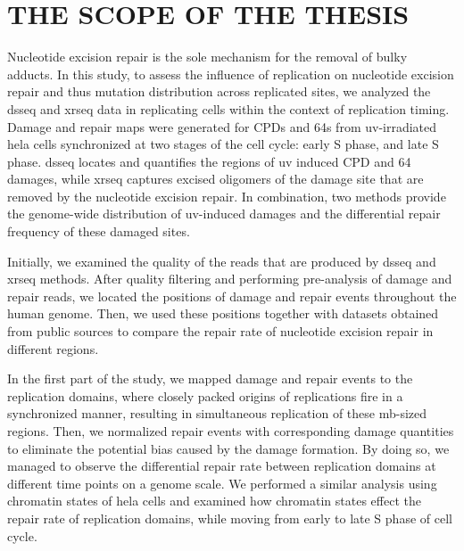 \setlength{\parindent}{0pt}
\chapter{\bf THE SCOPE OF THE THESIS}

Nucleotide excision repair is the sole mechanism for the removal of bulky adducts. In this study, to assess the influence of replication on nucleotide excision repair and thus mutation distribution across replicated sites, we analyzed the \gls{dsseq} and \gls{xrseq} data in replicating cells within the context of replication timing. Damage and repair maps were generated for \gls{CPD}s and \gls{64}s from \gls{uv}-irradiated \gls{hela} cells synchronized at two stages of the cell cycle: early S phase, and late S phase. \gls{dsseq} locates and quantifies the regions of \gls{uv} induced \gls{CPD} and \gls{64} damages, while \gls{xrseq} captures excised oligomers of the damage site that are removed by the nucleotide excision repair. In combination, two methods provide the genome-wide distribution of \gls{uv}-induced damages and the differential repair frequency of these damaged sites. 

Initially, we examined the quality of the reads that are produced by \gls{dsseq} and \gls{xrseq} methods. After quality filtering and performing pre-analysis of damage and repair reads, we located the positions of damage and repair events throughout the human genome. Then, we used these positions together with datasets obtained from public sources to compare the repair rate of nucleotide excision repair in different regions.

In the first part of the study, we mapped damage and repair events to the replication domains, where closely packed origins of replications fire in a synchronized manner, resulting in simultaneous replication of these \gls{mb}-sized regions. Then, we normalized repair events with corresponding damage quantities to eliminate the potential bias caused by the damage formation. By doing so, we managed to observe the differential repair rate between replication domains at different time points on a genome scale. We performed a similar analysis using chromatin states of \gls{hela} cells and examined how chromatin states effect the repair rate of replication domains, while moving from early to late S phase of cell cycle.

